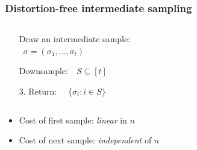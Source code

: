 \documentclass{beamer}
\begin{document}

\begin{frame}
  \frametitle{Distortion-free intermediate sampling \cite{dpp-intermediate,dpp-sublinear}}  
  \begin{columns}
    \begin{column}{0.55\textwidth}
  \begin{enumerate}
  \item[\Blue{1.}] Draw an intermediate sample:\\[-1mm]
    ~\hfill $\sigma=(\sigma_1,\dots,\sigma_t)$
  \item[\Red{2.}] Downsample: \ \,$S\subseteq[t]$
\item[3.] Return: \qquad\ \ $\{\sigma_i:i\in S\}$
  \end{enumerate}
\end{column}
\begin{column}{0.45\textwidth}
  \begin{center}
\end{center}
\end{column}
\end{columns}
\pause
\vspace{5mm}

\begin{block}{}
\begin{itemize}
\item Cost of first sample: \emph{linear} in $n$\pause
\item Cost of next sample: \emph{independent} of $n$
\end{itemize}
\end{block}
\end{frame}


\end{document}

